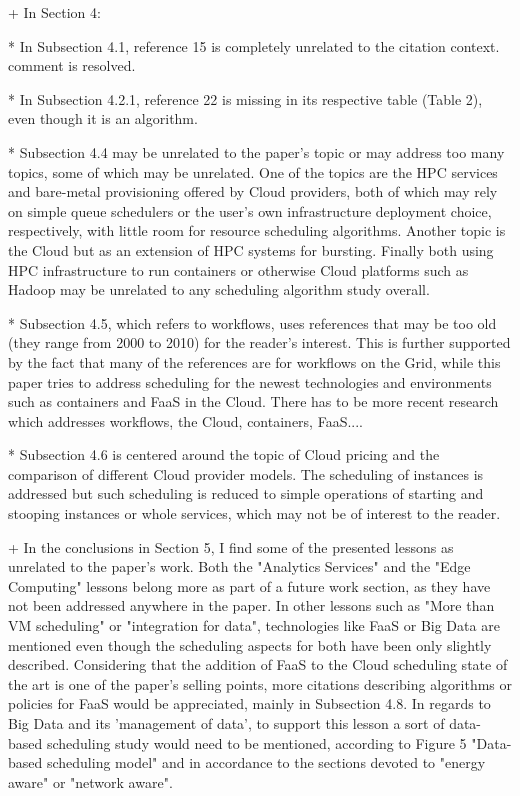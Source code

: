 + In Section 4:

* In Subsection 4.1, reference 15 is completely unrelated to the citation context.
\reply 
comment is resolved.

* In Subsection 4.2.1, reference 22 is missing in its respective table (Table 2), even though it is an algorithm.

\reply
{}


* Subsection 4.4 may be unrelated to the paper's topic or may address too many topics, some of which may be unrelated. One of the topics are the HPC services and bare-metal provisioning offered by Cloud providers, both of which may rely on simple queue schedulers or the user's own infrastructure deployment choice, respectively, with little room for resource scheduling algorithms. Another topic is the Cloud but as an extension of HPC systems for bursting. Finally both using HPC infrastructure to run containers or otherwise Cloud platforms such as Hadoop may be unrelated to any scheduling algorithm study overall.


* Subsection 4.5, which refers to workflows, uses references that may be too old (they range from 2000 to 2010) for the reader's interest. This is further supported by the fact that many of the references are for workflows on the Grid, while this paper tries to address scheduling for the newest technologies and environments such as containers and FaaS in the Cloud. There has to be more recent research which addresses workflows, the Cloud, containers, FaaS....

* Subsection 4.6 is centered around the topic of Cloud pricing and the comparison of different Cloud provider models. The scheduling of instances is addressed but such scheduling is reduced to simple operations of starting and stooping instances or whole services, which may not be of interest to the reader.


+ In the conclusions in Section 5, I find some of the presented lessons as unrelated to the paper's work. Both the "Analytics Services" and the "Edge Computing" lessons belong more as part of a future work section, as they have not been addressed anywhere in the paper. In other lessons such as "More than VM scheduling" or "integration for data", technologies like FaaS or Big Data are mentioned even though the scheduling aspects for both have been only slightly described. Considering that the addition of FaaS to the Cloud scheduling state of the art is one of the paper's selling points, more citations describing algorithms or policies for FaaS would be appreciated, mainly in Subsection 4.8. In regards to Big Data and its 'management of data', to support this lesson a sort of data-based scheduling study would need to be mentioned, according to Figure 5 "Data-based scheduling model" and in accordance to the sections devoted to "energy aware" or "network aware".


